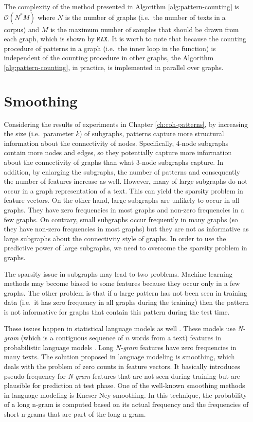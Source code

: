 The complexity of the method presented in Algorithm \ref{alg:pattern-counting} is $\mathcal{O}(N^ \ast M)$  where $N$ is the number of graphs (i.e.\ the number of texts in a corpus) and $M$ is the maximum number of samples that should be drawn from each graph, which is shown by $\mathtt{MAX}$.
It is worth to note that because the counting procedure of patterns in a graph (i.e.\ the inner loop in the function) is independent of the counting procedure in other graphs, the Algorithm \ref{alg:pattern-counting}, in practice, is implemented in parallel over graphs. 
  
\section{Smoothing} 
\label{sec:lex-graph-smoothing}

Considering the results of experiments in Chapter \ref{ch:coh-patterns}, 
by increasing the size (i.e.\ parameter $k$) of subgraphs, patterns capture more
structural information about the connectivity of nodes. 
Specifically, 4-node subgraphs contain more nodes and edges, so they potentially capture more information about the connectivity of graphs than what 3-node subgraphs capture.  
In addition, by enlarging the subgraphs, the number of patterns and consequently the number of features increase as well.   
However, many of large subgraphs do not occur in a graph representation of a text. 
This can yield the sparsity problem in feature vectors. 
On the other hand, large subgraphs are unlikely to occur in all graphs. 
They have zero frequencies in most graphs and non-zero frequencies in a few graphs.  
On contrary, small subgraphs occur frequently in many graphs (so they have non-zero frequencies in most graphs) but
they are not as informative as large subgraphs about the
connectivity style of graphs. 
In order to use the predictive power of large subgraphs, we need to overcome the sparsity problem in graphs. 
  
The sparsity issue in subgraphs may lead to two problems. 
Machine learning methods may become biased to some features because they occur only in a few graphs. 
The other problem is that if a large pattern has not been seen in training data (i.e.\ it has zero frequency in all graphs during the training) then the pattern is not informative for graphs  that contain this pattern during the test time. 

These issues happen in statistical language models as well \cite{jurafsky08}. 
These models use \emph{N-gram} (which is a contiguous sequence of $n$ words from a text) features in probabilistic language models . 
Long \emph{N-gram} features have zero frequencies in many texts.  
The solution proposed in language modeling is smoothing, which deals with the problem of zero counts in feature vectors. 
It basically introduces pseudo frequency for \emph{N-gram} features that are not seen during training but are plausible for prediction at test phase. 
One of the \mbox{well-known} smoothing methods in language modeling is \mbox{Kneser-Ney} smoothing. 
In this technique, the probability of a long n-gram is computed based on its actual frequency and the frequencies of short n-grams that are part of the long n-gram. 

